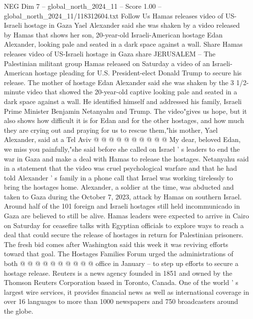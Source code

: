 \begin{textsample}{NEG Dim 7 – global\_north\_2024\_11 – Score 1.00 – global\_north\_2024\_11/118312604.txt}  \label{ex:f7_neg_345}
Follow Us Hamas releases video of US-Israeli hostage in Gaza Yael Alexander said she was shaken by a video released by Hamas that shows her son, 20-year-old Israeli-American hostage Edan Alexander, looking pale and seated in a dark space against a wall.
Share Hamas releases video of US-Israeli hostage in Gaza share JERUSALEM -- The Palestinian militant group Hamas released on Saturday a video of an Israeli-American hostage pleading for U.S.
President-elect Donald Trump to secure his release.
The mother of hostage Edan Alexander said she was shaken by the 3 1/2-minute video that showed the 20-year-old captive looking pale and seated in a dark space against a wall.
He identified himself and addressed his family, Israeli Prime Minister Benjamin Netanyahu and Trump.
The video"gives us hope, but it also shows how difficult it is for Edan and for the other hostages, and how much they are crying out and praying for us to rescue them,"his mother, Yael Alexander, said at a Tel Aviv @ @ @ @ @ @ @ @ @ @ My dear, beloved Edan, we miss you painfully,"she said before she called on Israel ' s leaders to end the war in Gaza and make a deal with Hamas to release the hostages.
Netanyahu said in a statement that the video was cruel psychological warfare and that he had told Alexander ' s family in a phone call that Israel was working tirelessly to bring the hostages home.
Alexander, a soldier at the time, was abducted and taken to Gaza during the October 7, 2023, attack by Hamas on southern Israel.
Around half of the 101 foreign and Israeli hostages still held incommunicado in Gaza are believed to still be alive.
Hamas leaders were expected to arrive in Cairo on Saturday for ceasefire talks with Egyptian officials to explore ways to reach a deal that could secure the release of hostages in return for Palestinian prisoners.
The fresh bid comes after Washington said this week it was reviving efforts toward that goal.
The Hostages Families Forum urged the administrations of both @ @ @ @ @ @ @ @ @ @ office in January -- to step up efforts to secure a hostage release.
Reuters is a news agency founded in 1851 and owned by the Thomson Reuters Corporation based in Toronto, Canada.
One of the world ' s largest wire services, it provides financial news as well as international coverage in over 16 languages to more than 1000 newspapers and 750 broadcasters around the globe.

\end{textsample}
